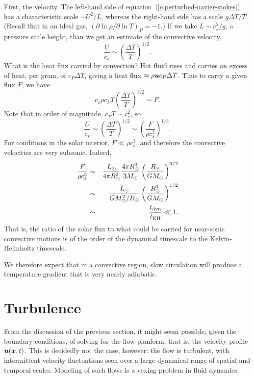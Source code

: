 First, the velocity.  The left-hand side of equation~(\ref{e.perturbed-navier-stokes}) has a characteristic scale $\sim U^{2}/L$, whereas the right-hand side has a scale $g\Delta T/T$. (Recall that in an ideal gas, $(\partial\ln \rho/\partial\ln T)_{P} = -1$.)  If we take $L \sim c_{s}^{2}/g$, a pressure scale height, than we get an estimate of the convective velocity,
\begin{equation}\label{e.convective-velocity-estimate}
\frac{U}{c_{s}} \sim \left(\frac{\Delta T}{T}\right)^{1/2}.
\end{equation}
What is the heat flux carried by convection? Hot fluid rises and carries an excess of heat, per gram, of $c_{P}\Delta T$, giving a heat flux $\approx \rho \boldsymbol{u} c_{P}\Delta T$. Thus to carry a given flux $F$, we have
\begin{equation}\label{e.convective-flux-estimate}
c_{s}\rho c_{P} T\left(\frac{\Delta T}{T}\right)^{3/2} \sim F.
\end{equation}
Note that in order of magnitude, $c_{P}T \sim c_{s}^{2}$, so 
\[
\frac{U}{c_{s}} \sim \left(\frac{\Delta T}{T}\right)^{1/2} \sim \left(\frac{F}{\rho c_{s}^{3}}\right)^{1/3}.
\]
For conditions in the solar interior, $F \ll \rho c_{s}^{3}$, and therefore the convective velocities are very subsonic. Indeed,
\begin{eqnarray*}
 \frac{F}{\rho c_{s}^{3}} &\sim& \frac{L_{\odot}}{4\pi R_{\odot}^{2}}\frac{4\pi R_{\odot}^{3}}{3M_\odot}\left(\frac{R_{\odot}}{GM_\odot}\right)^{3/2}\\
  &\sim& \frac{L_{\odot}}{GM_\odot^{2}/R_{\odot}}\left(\frac{R_{\odot}^{3}}{GM_\odot}\right)^{1/2} \\
 	&\sim& \frac{t_{\mathrm{dyn}}}{t_{\mathrm{KH}}} \ll 1.
\end{eqnarray*}
That is, the ratio of the solar flux to what could be carried for near-sonic convective motions is of the order of the dynamical timescale to the Kelvin-Helmholtz timescale.

We therefore expect that in a convective region, slow circulation will produce a temperature gradient that is very nearly adiabatic.

\section{Turbulence}
 
From the discussion of the previous section, it might seem possible, given the boundary conditions, of solving for the flow planform, that is, the velocity profile $\boldsymbol{u}(\boldsymbol{x},t)$. This is decidedly not the case, however: the flow is turbulent, with intermittent velocity fluctuations seen over a large dynamical range of spatial and temporal scales. Modeling of such flows is a vexing problem in fluid dynamics.

